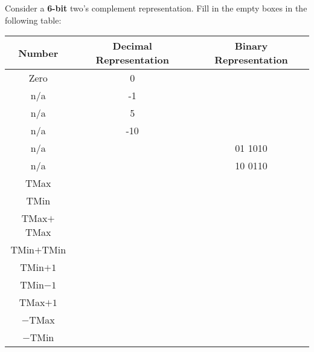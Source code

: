 \begin{problem}{10}
Consider a {\bf 6-bit} two's complement representation.
Fill in the empty boxes in the following table:\\

\begin{center}
\renewcommand{\arraystretch}{1.8}
\begin{tabular}{|c|c|c|} 
\hline 
Number    & Decimal Representation & Binary Representation \\ \hline \hline 
Zero      &       0                &			   \\ \hline
n/a       &       -1               &			   \\ \hline
n/a       &       5                &			   \\ \hline
n/a       &       -10              &			   \\ \hline
n/a       &                        &   01 1010             \\ \hline
n/a       &                        &   10 0110             \\ \hline
TMax      &                        &                       \\ \hline
TMin      &                        &                       \\ \hline
TMax$+$TMax &                      &                       \\ \hline
TMin$+$TMin &                      &                       \\ \hline
TMin$+1$    &                      &                       \\ \hline
TMin$-1$    &                      &                       \\ \hline
TMax$+1$    &                      &                       \\ \hline
$-$TMax     &                      &                       \\ \hline
$-$TMin     &                      &                       \\ \hline
\end{tabular}
\end{center}

\end{problem}

%


